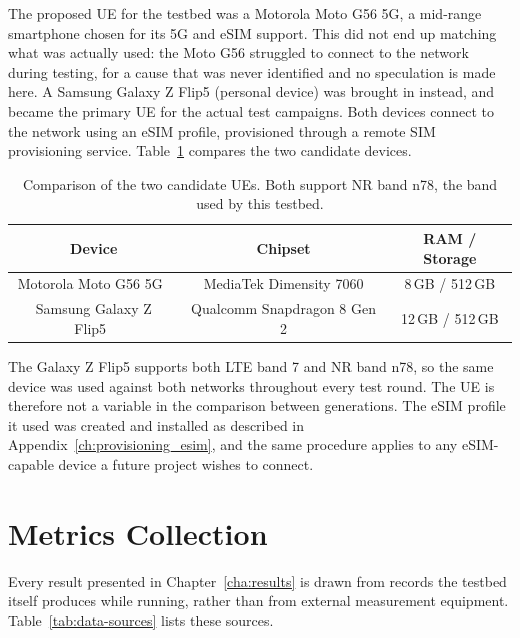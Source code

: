 The proposed \gls{UE} for the testbed was a Motorola Moto G56 5G, a mid-range smartphone chosen for its 5G and eSIM support. This did not end up matching what was actually used: the Moto G56 struggled to connect to the network during testing, for a cause that was never identified and no speculation is made here. A Samsung Galaxy Z Flip5 (personal device) was brought in instead, and became the primary \gls{UE} for the actual test campaigns. Both devices connect to the network using an eSIM profile, provisioned through a remote SIM provisioning service. Table~\ref{tab:ue-comparison} compares the two candidate devices.

\begin{table}[htbp]
    \centering
    \begin{tabular}{|c|c|c|}
        \hline
        \textbf{Device} & \textbf{Chipset} & \textbf{RAM / Storage}\\
        \hline
        Motorola Moto G56 5G~\cite{gsmarena_moto_g56} & MediaTek Dimensity 7060 & 8\,GB / 512\,GB\\
        \hline
        Samsung Galaxy Z Flip5~\cite{gsmarena_z_flip5} & Qualcomm Snapdragon 8 Gen 2 & 12\,GB / 512\,GB \\
        \hline
    \end{tabular}
    \caption[Comparison of the two candidate UEs.]{Comparison of the two candidate \glspl{UE}. Both support \gls{NR} band n78, the band used by this testbed.}
    \label{tab:ue-comparison}
\end{table}

The Galaxy Z Flip5 supports both \gls{LTE} band 7 and \gls{NR} band n78, so the same device was used against both networks throughout every test round. The \gls{UE} is therefore not a variable in the comparison between generations. The eSIM profile it used was created and installed as described in Appendix~\ref{ch:provisioning_esim}, and the same procedure applies to any eSIM-capable device a future project wishes to connect.

\section{Metrics Collection}
\label{sec:data-collection}

Every result presented in Chapter~\ref{cha:results} is drawn from records the testbed itself produces while running, rather than from external measurement equipment. Table~\ref{tab:data-sources} lists these sources.

